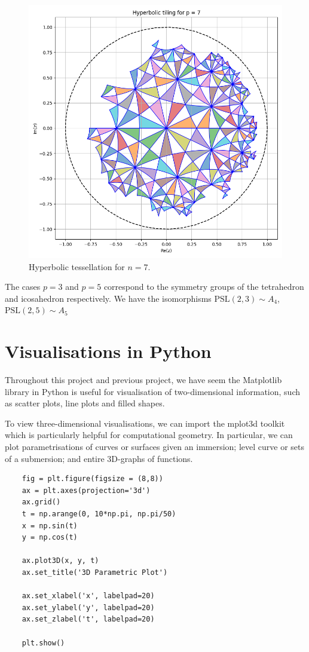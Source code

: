 \documentclass{article}
\begin{document}
\begin{figure}
    \centering
    \includegraphics[width=1.0\linewidth]{images/tiling_7.png}
    \caption{Hyperbolic tessellation for \(n = 7\).}
\end{figure}

The cases \(p = 3\) and \(p = 5\) correspond to the symmetry groups of the tetrahedron and icosahedron respectively. We have the isomorphisms \(\mathrm{PSL}(2,3)\sim A_4\), \(\mathrm{PSL}(2,5)\sim A_5\)

\section{Visualisations in Python}

Throughout this project and previous project, we have seem the Matplotlib library in Python is useful for visualisation of two-dimensional information, such as scatter plots, line plots and filled shapes. 

To view three-dimensional visualisations, we can import the mplot3d toolkit which is particularly helpful for computational geometry. In particular, we can plot parametrisations of curves or surfaces given an immersion; level curve or sets of a submersion; and entire \(3\)D-graphs of functions. 

\begin{verbatim}
    fig = plt.figure(figsize = (8,8))
    ax = plt.axes(projection='3d')
    ax.grid()
    t = np.arange(0, 10*np.pi, np.pi/50)
    x = np.sin(t)
    y = np.cos(t)
    
    ax.plot3D(x, y, t)
    ax.set_title('3D Parametric Plot')
    
    ax.set_xlabel('x', labelpad=20)
    ax.set_ylabel('y', labelpad=20)
    ax.set_zlabel('t', labelpad=20)
    
    plt.show()
\end{verbatim}
\end{document}
